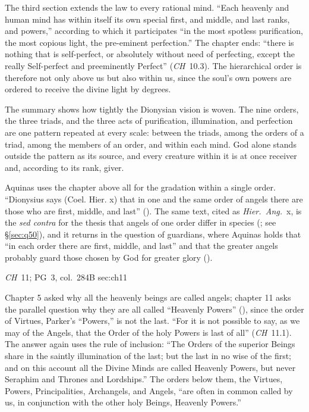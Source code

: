 The third section extends the law to every rational mind. ``Each
heavenly and human mind has within itself its own special first, and
middle, and last ranks, and powers,'' according to which it participates
``in the most spotless purification, the most copious light, the
pre-eminent perfection.'' The chapter ends: ``there is nothing that is
self-perfect, or absolutely without need of perfecting, except the really
Self-perfect and preeminently Perfect'' (\emph{CH}~10.3). The
hierarchical order is therefore not only above us but also within us,
since the soul's own powers are ordered to receive the divine light by
degrees.

The summary shows how tightly the Dionysian vision is woven. The nine
orders, the three triads, and the three acts of purification,
illumination, and perfection are one pattern repeated at every scale:
between the triads, among the orders of a triad, among the members of an
order, and within each mind. God alone stands outside the pattern as its
source, and every creature within it is at once receiver and, according
to its rank, giver.

Aquinas uses the chapter above all for the gradation within a single
order. ``Dionysius says (Coel. Hier. x) that in one and the same order of
angels there are those who are first, middle, and last'' (). The same text, cited as \emph{Hier.\ Ang.}\ x, is the
\emph{sed contra} for the thesis that angels of one order differ in
species (; see \S\ref{sec:q50}), and it returns in
the question of guardians, where Aquinas holds that ``in each order there
are first, middle, and last'' and that the greater angels probably guard
those chosen by God for greater glory ().

{\emph{CH}~11; PG~3, col.~284B}
{}{sec:ch11}

Chapter 5 asked why all the heavenly beings are called angels; chapter 11
asks the parallel question why they are all called ``Heavenly Powers''
(), since the order of Virtues, Parker's ``Powers,''
is not the last. ``For it is not possible to say, as we may of the Angels,
that the Order of the holy Powers is last of all'' (\emph{CH}~11.1). The
answer again uses the rule of inclusion: ``The Orders of the superior
Beings share in the saintly illumination of the last; but the last in no
wise of the first; and on this account all the Divine Minds are called
Heavenly Powers, but never Seraphim and Thrones and Lordships.'' The
orders below them, the Virtues, Powers, Principalities, Archangels, and Angels,
``are often in common called by us, in conjunction with the other holy
Beings, Heavenly Powers.''

